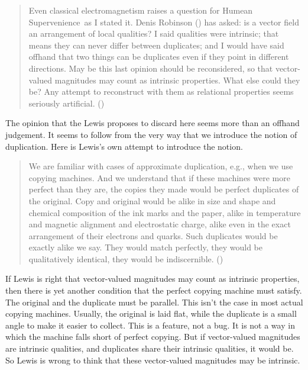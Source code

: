 \documentclass[
  10pt,
  letterpaper,
  DIV=11,
  numbers=noendperiod,
  twoside]{scrartcl}
\begin{document}
\begin{quote}
Even classical electromagnetism raises a question for Humean
Supervenience~as I stated it. Denis Robinson
() has asked: is a vector field an
arrangement of local qualities? I said qualities were intrinsic; that
means they can never differ between duplicates; and I would have said
offhand that two things can be duplicates even if they point in
different directions. May be this last opinion should be reconsidered,
so that vector-valued magnitudes may count as intrinsic properties. What
else could they be? Any attempt to reconstruct with them as relational
properties seems seriously artificial. ()
\end{quote}

The opinion that the Lewis proposes to discard here seems more than an
offhand judgement. It seems to follow from the very way that we
introduce the notion of duplication. Here is Lewis's own attempt to
introduce the notion.

\begin{quote}
We are familiar with cases of approximate duplication, e.g., when we use
copying machines. And we understand that if these machines were more
perfect than they are, the copies they made would be perfect duplicates
of the original. Copy and original would be alike in size and shape and
chemical composition of the ink marks and the paper, alike in
temperature and magnetic alignment and electrostatic charge, alike even
in the exact arrangement of their electrons and quarks. Such duplicates
would be exactly alike we say. They would match perfectly, they would be
qualitatively identical, they would be indiscernible.
()
\end{quote}

If Lewis is right that vector-valued magnitudes may count as intrinsic
properties, then there is yet another condition that the perfect copying
machine must satisfy. The original and the duplicate must be parallel.
This isn't the case in most actual copying machines. Usually, the
original is laid flat, while the duplicate is a small angle to make it
easier to collect. This is a feature, not a bug. It is not a way in
which the machine falls short of perfect copying. But if vector-valued
magnitudes are intrinsic qualities, and duplicates share their intrinsic
qualities, it would be. So Lewis is wrong to think that these
vector-valued magnitudes may be intrinsic.
\end{document}
